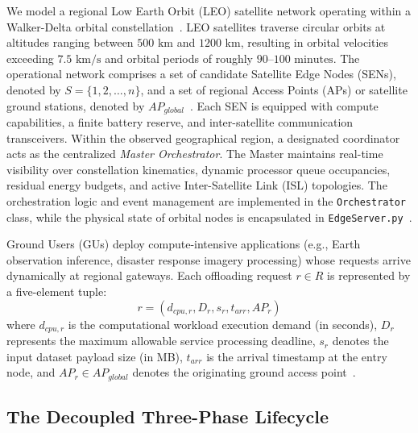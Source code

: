 We model a regional Low Earth Orbit (LEO) satellite network operating within a Walker-Delta orbital constellation~\cite{walker1984satellite, survey_orbital_edge_2023}. 
LEO satellites traverse circular orbits at altitudes ranging between $500\text{ km}$ and $1200\text{ km}$, resulting in orbital velocities exceeding $7.5\text{ km/s}$ and orbital periods of roughly $90\text{--}100\text{ minutes}$. 
The operational network comprises a set of candidate Satellite Edge Nodes (SENs), denoted by $S = \{1, 2, \dots, n\}$, and a set of regional Access Points (APs) or satellite ground stations, denoted by $AP_{global}$~\cite{icdcs_satellite_2025}. 
Each SEN is equipped with compute capabilities, a finite battery reserve, and inter-satellite communication transceivers. 
Within the observed geographical region, a designated coordinator acts as the centralized \emph{Master Orchestrator}. The Master maintains real-time visibility over constellation kinematics, dynamic processor queue occupancies, residual energy budgets, and active Inter-Satellite Link (ISL) topologies. 
The orchestration logic and event management are implemented in the \texttt{Orchestrator} class, while the physical state of orbital nodes is encapsulated in \texttt{EdgeServer.py}~\cite{bagini_repo_2026}.

Ground Users (GUs) deploy compute-intensive applications (e.g., Earth observation inference, disaster response imagery processing) whose requests arrive dynamically at regional gateways. 
Each offloading request $r \in R$ is represented by a five-element tuple:
\begin{equation}
    r = \left( d_{cpu,r}, D_r, s_r, t_{arr}, AP_r \right)
\end{equation}
where $d_{cpu,r}$ is the computational workload execution demand (in seconds), $D_r$ represents the maximum allowable service processing deadline, $s_r$ denotes the input dataset payload size (in MB), $t_{arr}$ is the arrival timestamp at the entry node, and $AP_r \in AP_{global}$ denotes the originating ground access point~\cite{icdcs_satellite_2025}.

\subsection{The Decoupled Three-Phase Lifecycle}
\label{subsec:decoupled_lifecycle}

